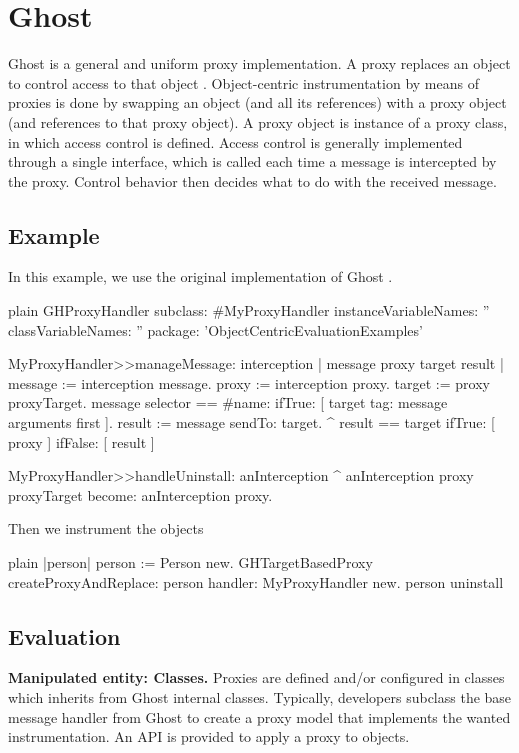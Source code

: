 \documentclass[10pt,twoside,english]{_support/latex/sbabook/sbabook}
\begin{document}
\chapter{Ghost}
Ghost is a general and uniform proxy implementation\cite{Mart14z}. A proxy replaces an object to control access to that object \cite{alpert1998design}. Object-centric instrumentation by means of proxies is done by swapping an object (and all its references) with a proxy object (and references to that proxy object). A proxy object is instance of a proxy class, in which access control is defined. Access control is generally implemented through a single interface, which is called each time a message is intercepted by the proxy. Control behavior then decides what to do with the received message.
\section{Example}
In this example, we use the original implementation of Ghost \cite{Mart14z}.

\begin{displaycode}{plain}
GHProxyHandler subclass: #MyProxyHandler
	instanceVariableNames: ''
	classVariableNames: ''
	package: 'ObjectCentricEvaluationExamples'

MyProxyHandler>>manageMessage: interception
	| message proxy target result |
	message := interception message.
	proxy := interception proxy.
	target := proxy proxyTarget.
	message selector == #name:
		ifTrue: [ target tag: message arguments first ].
	result := message sendTo: target.
	^ result == target
		ifTrue: [ proxy ]
		ifFalse: [ result ]

MyProxyHandler>>handleUninstall: anInterception
	^ anInterception proxy proxyTarget become: anInterception proxy.
\end{displaycode}

Then we instrument the objects

\begin{displaycode}{plain}
|person|
  person := Person new.
  GHTargetBasedProxy createProxyAndReplace: person handler: MyProxyHandler new.
  person uninstall
\end{displaycode}
\section{Evaluation}
\textbf{Manipulated entity: Classes.} Proxies are defined and/or configured in classes which inherits from Ghost internal classes. Typically, developers subclass the base message handler from Ghost to create a proxy model that implements the wanted instrumentation. An API is provided to apply a proxy to objects.
\end{document}
